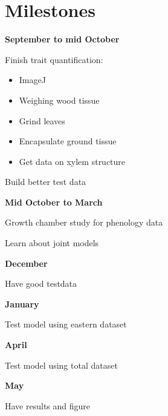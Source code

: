 \documentclass[11pt,a4paper,oneside]{article}
\begin{document}
\section*{Milestones}

\textbf{September to mid October}
\par Finish trait quantification:
\begin{itemize}
\item ImageJ
\item Weighing wood tissue
\item Grind leaves
\item Encapsulate ground tissue
\item Get data on xylem structure 
\end{itemize}
\par Build better test data

\textbf{Mid October to March}
\par Growth chamber study for phenology data
\par Learn about joint models

\textbf{December}
\par Have good testdata

\textbf{January}
\par Test model using eastern dataset

\textbf{April}
\par Test model using total dataset

\textbf{May}
\par Have results and figure


\end{document}
